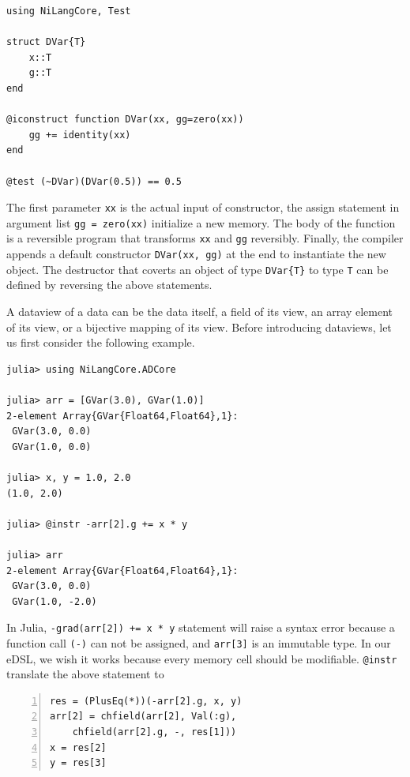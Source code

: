 \documentclass[aps,twocolumn,longbibliography,english,superscriptaddress]{revtex4-1}
\newcommand{\<}{\langle}
\renewcommand{\>}{\rangle}
\theoremstyle{definition}\newtheorem{definition}{\textit{Definition}}
\begin{document}
\begin{minipage}{.44\textwidth}
\begin{lstlisting}
using NiLangCore, Test

struct DVar{T}
    x::T
    g::T
end

@iconstruct function DVar(xx, gg=zero(xx))
    gg += identity(xx)
end

@test (~DVar)(DVar(0.5)) == 0.5
\end{lstlisting}
\end{minipage}

The first parameter \texttt{xx} is the actual input of constructor, the assign statement in argument list \texttt{gg = zero(xx)} initialize a new memory. The body of the function is a reversible program that transforms \texttt{xx} and \texttt{gg} reversibly. Finally, the compiler appends a default constructor \texttt{DVar(xx, gg)} at the end to instantiate the new object.
The destructor that coverts an object of type \texttt{DVar\{T\}} to type \texttt{T} can be defined by reversing the above statements.%

A dataview of a data can be the data itself, a field of its view, an array element of its view, or a bijective mapping of its view.
Before introducing dataviews, let us first consider the following example.

\begin{minipage}{.44\textwidth}
\begin{lstlisting}
julia> using NiLangCore.ADCore

julia> arr = [GVar(3.0), GVar(1.0)]
2-element Array{GVar{Float64,Float64},1}:
 GVar(3.0, 0.0)
 GVar(1.0, 0.0)

julia> x, y = 1.0, 2.0
(1.0, 2.0)

julia> @instr -arr[2].g += x * y

julia> arr
2-element Array{GVar{Float64,Float64},1}:
 GVar(3.0, 0.0)
 GVar(1.0, -2.0)
\end{lstlisting}
\end{minipage}

In Julia, \texttt{-grad(arr[2]) += x * y} statement will raise a syntax error because a function call \texttt{(-)} can not be assigned, and \texttt{arr[3]} is an immutable type.
In our eDSL, we wish it works because every memory cell should be modifiable.
\texttt{@instr} translate the above statement to

\begin{minipage}{.44\textwidth}
    \begin{lstlisting}[numberstyle=\scriptsize\color{gray},numbers=left,numbersep=8pt]
res = (PlusEq(*))(-arr[2].g, x, y)
arr[2] = chfield(arr[2], Val(:g),
    chfield(arr[2].g, -, res[1]))
x = res[2]
y = res[3]
\end{lstlisting}
\end{minipage}
\end{document}
